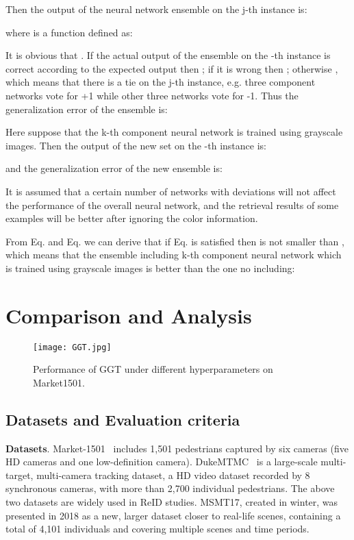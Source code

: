 \documentclass[10pt,twocolumn,letterpaper]{article}
\begin{document}
Then the output of the neural network ensemble on the j-th instance is:



where  is a function defined as:



It is obvious that   . If the actual output of the ensemble on the -th instance is correct according to the expected output then ; if it is wrong then ; otherwise , which means that there is a tie on the j-th instance, e.g. three component networks vote for +1 while other three networks vote for -1. Thus the generalization error of the ensemble is:



Here suppose that the k-th component neural network is trained using grayscale images. Then the output of the new set on the -th instance is:

and the generalization error of the new ensemble is:

It is assumed that a certain number of networks with deviations will not affect the performance of the overall neural network, and the retrieval results of some examples will be better after ignoring the color information.

From Eq. and Eq. we can derive that if Eq. is satisfied then  is not smaller than , which means that the ensemble including k-th component neural network which is trained using grayscale images is better than the one no including:


\section{Comparison and Analysis}
\begin{figure}[t]
	\setlength{\abovecaptionskip}{0.1cm}
	\setlength{\belowcaptionskip}{-0.4cm}   \centering
	\texttt{[image: GGT.jpg]}
	\caption{Performance of GGT under different hyperparameters on Market1501.}
\end{figure}
\subsection{Datasets and Evaluation criteria}
\textbf{Datasets}. Market-1501~\cite{market1501} includes 1,501 pedestrians captured by six cameras (five HD cameras and one low-definition camera). DukeMTMC~\cite{duke} is a large-scale multi-target, multi-camera tracking dataset, a HD video dataset recorded by 8 synchronous cameras, with more than 2,700 individual pedestrians. The above two datasets are widely used in ReID studies. MSMT17\cite{wei2018person}, created in winter, was presented in 2018 as a new, larger dataset closer to real-life scenes, containing a total of 4,101 individuals and covering multiple scenes and time periods.
\end{document}
